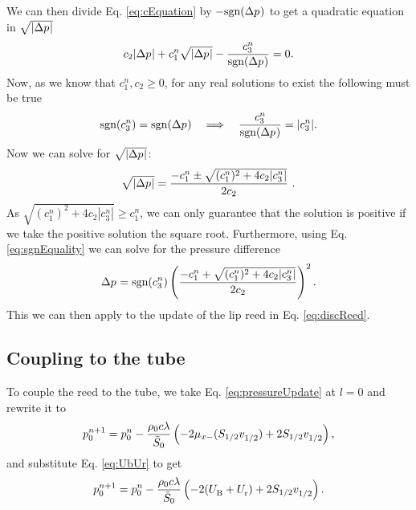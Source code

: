 We can then divide Eq. \eqref{eq:cEquation} by $-\text{sgn}(\Delta p^{})$ to get a quadratic equation in $\sqrt{|\Delta p^{}|}$
\begin{equation}
    c_2|\Delta p^{}| + c_1^n\sqrt{|\Delta p^{}|} - \frac{c_3^n}{\text{sgn}(\Delta p^{})} = 0.
\end{equation}
Now, as we know that $c_1^n, c_2 \geq 0$, for any real solutions to exist the following must be true
\begin{equation}\label{eq:sgnEquality}
    \text{sgn}(c_3^n) = \text{sgn}(\Delta p^{}) \quad \Longrightarrow \quad \frac{c_3^n}{\text{sgn}(\Delta p^{})} = |c_3^n|.
\end{equation}
Now we can solve for $\sqrt{|\Delta p^{}|}$:
\begin{equation}
    \sqrt{|\Delta p^{}|} = \frac{-c_1^n \pm \sqrt{(c^n_1)^2+4c_2|c_3^n|}}{2c_2}\ .
\end{equation}
As $\sqrt{(c_1^n)^2 + 4c_2|c_3^n|} \geq c_1^n$, we can only guarantee that the solution is positive if we take the positive solution the square root. Furthermore, using Eq. \eqref{eq:sgnEquality} we can solve for the pressure difference
\begin{equation}\label{eq:pressureDiff}
    \Delta p^{} = \text{sgn}(c_3^n)\left(\frac{-c_1^n + \sqrt{(c^n_1)^2+4c_2|c_3^n|}}{2c_2}\right)^2.
\end{equation}
This we can then apply to the update of the lip reed in Eq. \eqref{eq:discReed}. 

\subsection{Coupling to the tube}
To couple the reed to the tube, we take Eq. \eqref{eq:pressureUpdate} at $l=0$ and rewrite it to
\begin{equation}\label{eq:tubeCoupling}
    p^{n+1}_0 = p_0^n - \frac{\rho_0c\lambda}{\bar S_0}\left(-2\mu_{x-}(S_{1/2}v_{1/2}^{}) + 2 S_{1/2}v_{1/2}^{}\right),
\end{equation}
and substitute Eq. \eqref{eq:UbUr} to get
\begin{equation}\label{eq:pressureCoupled}
    p^{n+1}_0 = p_0^n - \frac{\rho_0c\lambda}{\bar S_0}\left(-2(U_\text{B}^{} + U_\text{r}^{}) + 2 S_{1/2}v_{1/2}^{}\right).
\end{equation}
